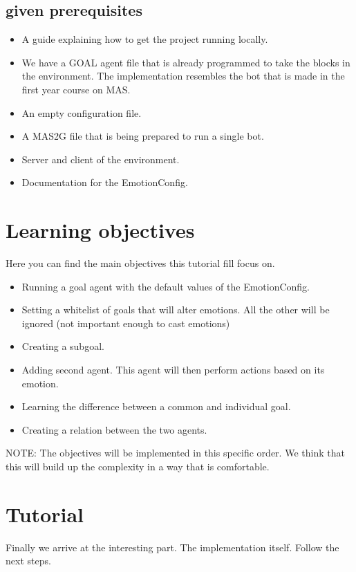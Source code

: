 \documentclass{scrartcl}
\begin{document}
\subsection{given prerequisites}
\begin{itemize}
	\item A guide explaining how to get the project running locally.
	\item We have a GOAL agent file that is already programmed to take the blocks in the environment. The implementation resembles the bot that is made in the first year course on MAS.
	\item An empty configuration file.
	\item A MAS2G file that is being prepared to run a single bot.
	\item Server and client of the environment.
	\item Documentation for the EmotionConfig. 
\end{itemize}

\section{Learning objectives}
Here you can find the main objectives this tutorial fill focus on.\\
\begin{itemize}
\item Running a goal agent with the default values of the EmotionConfig.\\
\item Setting a whitelist of goals that will alter emotions. All the other will be ignored (not important enough to cast emotions)\\
\item Creating a subgoal.
\item Adding second agent. This agent will then perform actions based on its emotion. 
\item Learning the difference between a common and individual goal.
\item Creating a relation between the two agents.
\end{itemize}
NOTE: The objectives will be implemented in this specific order. We think that this will build up the complexity in a way that is comfortable.

\section{Tutorial}
Finally we arrive at the interesting part. The implementation itself. Follow the next steps.
\end{document}
